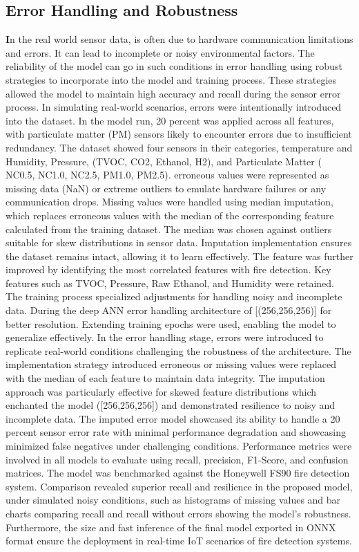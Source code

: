 \documentclass[conference]{IEEEtran}
\begin{document}
\subsection{Error Handling and Robustness}
\textbf 
In the real world sensor data, is often due to hardware communication limitations and errors. It can lead to incomplete or noisy environmental factors. The reliability of the model can go in such conditions in error handling using robust strategies to incorporate into the model and training process. These strategies allowed the model to maintain high accuracy and recall during the sensor error process. 
In simulating real-world scenarios, errors were intentionally introduced into the dataset. In the model run, 20 percent was applied across all features, with particulate matter (PM) sensors likely to encounter errors due to insufficient redundancy. The dataset showed four sensors in their categories, temperature and Humidity, Pressure, (TVOC, CO2, Ethanol, H2), and Particulate Matter ( NC0.5, NC1.0, NC2.5, PM1.0, PM2.5). erroneous values were represented as missing data (NaN) or extreme outliers to emulate hardware failures or any communication drops. 
Missing values were handled using median imputation, which replaces erroneous values with the median of the corresponding feature calculated from the training dataset. The median was chosen against outliers suitable for skew distributions in sensor data. Imputation implementation ensures the dataset remains intact, allowing it to learn effectively. The feature was further improved by identifying the most correlated features with fire detection. Key features such as TVOC, Pressure, Raw Ethanol, and Humidity were retained.    
The training process specialized adjustments for handling noisy and incomplete data. During the deep ANN error handling architecture of [(256,256,256)] for better resolution. Extending training epochs were used, enabling the model to generalize effectively. In the error handling stage, errors were introduced to replicate real-world conditions challenging the robustness of the architecture. The implementation strategy introduced erroneous or missing values were replaced with the median of each feature to maintain data integrity. The imputation approach was particularly effective for skewed feature distributions which enchanted the model ([256,256,256]) and demonstrated resilience to noisy and incomplete data. The imputed error model showcased its ability to handle a 20 percent sensor error rate with minimal performance degradation and showcasing minimized false negatives under challenging conditions. Performance metrics were involved in all models to evaluate using recall, precision, F1-Score, and confusion matrices. The model was benchmarked against the Honeywell FS90 fire detection system. Comparison revealed superior recall and resilience in the proposed model, under simulated noisy conditions, such as histograms of missing values and bar charts comparing recall and recall without errors showing the model's robustness. Furthermore, the size and fast inference of the final model exported in ONNX format ensure the deployment in real-time IoT scenarios of fire detection systems.
\end{document}
